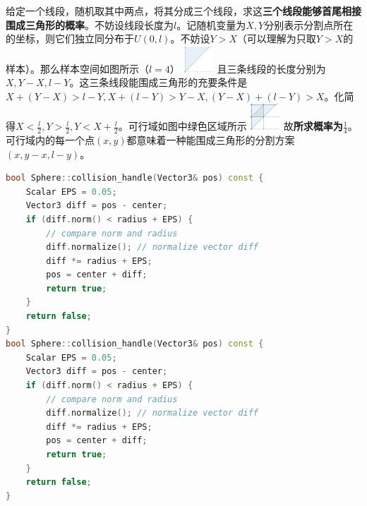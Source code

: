 \documentclass[]{article}
\begin{document}
\begin{multicols}{3}
给定一个线段，随机取其中两点，将其分成三个线段，求这\textbf{三个线段能够首尾相接围成三角形的概率}。不妨设线段长度为$l$。记随机变量为$X,Y$分别表示分割点所在的坐标，则它们独立同分布于$U(0,l)$。不妨设$Y > X$（可以理解为只取$Y>X$的样本）。那么样本空间如图所示（$l=4$）
\includegraphics[height=10mm]{./img/1.png}
且三条线段的长度分别为$X,Y-X, l-Y$。这三条线段能围成三角形的充要条件是$X + (Y-X) > l -Y, X + (l - Y) > Y - X, (Y - X) + (l - Y) > X$。化简得$X < \frac{l}{2}, Y > \frac{l}{2}, Y < X + \frac{l}{2}$。可行域如图中绿色区域所示
\includegraphics[height=10mm]{./img/2.png}
故\textbf{所求概率为$\frac{1}{4}$}。可行域内的每一个点$(x,y)$都意味着一种能围成三角形的分割方案$(x,y-x,l-y)$。

\begin{lstlisting}[language=c++]
bool Sphere::collision_handle(Vector3& pos) const {
    Scalar EPS = 0.05;
    Vector3 diff = pos - center;
    if (diff.norm() < radius + EPS) {
        // compare norm and radius
        diff.normalize(); // normalize vector diff
        diff *= radius + EPS;
        pos = center + diff;
        return true;
    }
    return false;
}
bool Sphere::collision_handle(Vector3& pos) const {
    Scalar EPS = 0.05;
    Vector3 diff = pos - center;
    if (diff.norm() < radius + EPS) {
        // compare norm and radius
        diff.normalize(); // normalize vector diff
        diff *= radius + EPS;
        pos = center + diff;
        return true;
    }
    return false;
}
\end{lstlisting}





\end{multicols}
\end{document}
